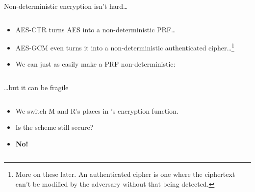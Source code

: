 \documentclass[aspectratio=169, lualatex, handout]{beamer}
\begin{document}
\begin{frame}{Non-deterministic encryption isn't hard\ldots}
	\begin{columns}[c]
		\begin{column}{0.5\textwidth}
			\begin{itemize}
				\item AES-CTR turns AES into a non-deterministic PRF\ldots
				\item AES-GCM even turns it into a non-deterministic authenticated cipher\ldots\footnote{More on these later. An authenticated cipher is one where the ciphertext can't be modified by the adversary without that being detected.}
				\item We can just as easily make a PRF non-deterministic:
			\end{itemize}
		\end{column}
		\begin{column}{0.5\textwidth}
		\end{column}
	\end{columns}
\end{frame}

\begin{frame}{\ldots but it can be fragile}
	\begin{columns}[c]
		\begin{column}{0.5\textwidth}
			\begin{itemize}
				\item<1-2> We switch M and R's places in 's encryption function.
				\item<1-2> Is the scheme still secure?
				\item<2-2> \textbf{No!}
			\end{itemize}
		\end{column}
		\begin{column}{0.5\textwidth}
		\end{column}
	\end{columns}
\end{frame}
\end{document}
